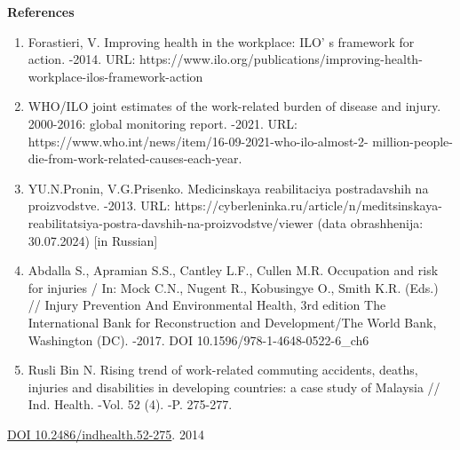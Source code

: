 \begin{center}

{\bfseries References}
\end{center}

\begin{references}

\begin{enumerate}
\def\labelenumi{\arabic{enumi}.}
\item
  Forastieri, V. Improving health in the workplace:
  ILO' s framework for action. -2014. URL:
  https://www.ilo.org/publications/improving-health-workplace-ilos-framework-action
\item
  WHO/ILO joint estimates of the work-related burden of disease and
  injury. 2000-2016: global monitoring report. -2021. URL:
  https://www.who.int/news/item/16-09-2021-who-ilo-almost-2-
  million-people-die-from-work-related-causes-each-year.
\item
  YU.N.Pronin, V.G.Prisenko. Medicinskaya reabilitaciya postradavshih na
  proizvodstve. -2013. URL:
  https://cyberleninka.ru/article/n/meditsinskaya-reabilitatsiya-postra-davshih-na-proizvodstve/viewer
  (data obrashhenija: 30.07.2024) {[}in Russian{]}
\item
  Abdalla S., Apramian S.S., Cantley L.F., Cullen M.R. Occupation and
  risk for injuries / In: Mock C.N., Nugent R., Kobusingye O., Smith
  K.R. (Eds.) // Injury Prevention And Environmental Health, 3rd edition
  The International Bank for Reconstruction and Development/The World
  Bank, Washington (DC). -2017. DOI 10.1596/978-1-4648-0522-6\_ch6
\item
  Rusli Bin N. Rising trend of work-related commuting accidents, deaths,
  injuries and disabilities in developing countries: a case study of
  Malaysia // Ind. Health. -Vol. 52 (4). -P. 275-277.
\end{enumerate}

\href{https://doi.org/10.2486/indhealth.52-275}{DOI
10.2486/indhealth.52-275}. 2014


\end{references}
